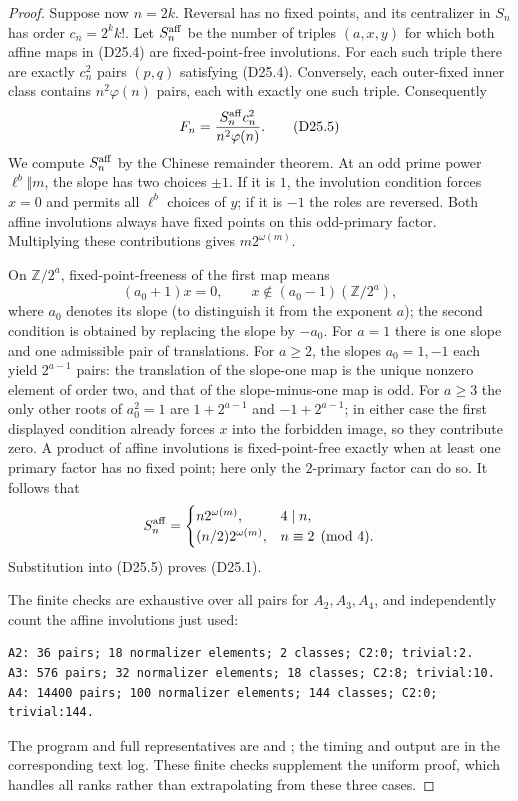 \begin{proof}
Suppose now $n=2k$.  Reversal has no fixed points, and its
centralizer in $S_n$ has order $c_n=2^k k!$.
Let $S_n^{\rm aff}$ be the number of triples $(a,x,y)$ for which
both affine maps in (D25.4) are fixed-point-free involutions.
For each such triple there are exactly $c_n^2$ pairs $(p,q)$
satisfying (D25.4).  Conversely, each outer-fixed inner class
contains $n^2\varphi(n)$ pairs, each with exactly one such triple.
Consequently
\[
 F_n=\frac{S_n^{\rm aff}c_n^2}{n^2\varphi(n)}.           \tag{D25.5}
\]
We compute $S_n^{\rm aff}$ by the Chinese remainder theorem.
At an odd prime power $\ell^b\Vert m$, the slope has two choices
$\pm1$.  If it is $1$, the involution condition forces $x=0$
and permits all $\ell^b$ choices of $y$; if it is $-1$ the roles
are reversed.  Both affine involutions always have fixed points
on this odd-primary factor.  Multiplying these contributions gives
$m2^{\omega(m)}$.

On $\mathbb Z/2^a$, fixed-point-freeness of the first map means
\[
 (a_0+1)x=0,\qquad x\notin(a_0-1)(\mathbb Z/2^a),
\]
where $a_0$ denotes its slope (to distinguish it from the exponent
$a$); the second condition is obtained by replacing the slope by
$-a_0$.  For $a=1$ there is one slope and one admissible pair of
translations.  For $a\ge2$, the slopes $a_0=1,-1$ each yield
$2^{a-1}$ pairs: the translation of the slope-one map is the
unique nonzero element of order two, and that of the slope-minus-one
map is odd.  For $a\ge3$ the only other roots of $a_0^2=1$ are
$1+2^{a-1}$ and $-1+2^{a-1}$; in either case the first displayed
condition already forces $x$ into the forbidden image, so they
contribute zero.  A product of affine involutions is fixed-point-free
exactly when at least one primary factor has no fixed point;
here only the $2$-primary factor can do so.  It follows that
\[
 S_n^{\rm aff}=
 \begin{cases}
 n2^{\omega(m)},&4\mid n,\\
 (n/2)2^{\omega(m)},&n\equiv2\pmod4.
 \end{cases}
\]
Substitution into (D25.5) proves (D25.1).

The finite checks are exhaustive over all pairs for $A_2,A_3,A_4$,
and independently count the affine involutions just used:
\begin{verbatim}
A2: 36 pairs; 18 normalizer elements; 2 classes; C2:0; trivial:2.
A3: 576 pairs; 32 normalizer elements; 18 classes; C2:8; trivial:10.
A4: 14400 pairs; 100 normalizer elements; 144 classes; C2:0; trivial:144.
\end{verbatim}
The program and full representatives are
 and
;
the timing and output are in the corresponding text log.
These finite checks supplement the uniform proof, which handles
all ranks rather than extrapolating from these three cases.
\end{proof}

